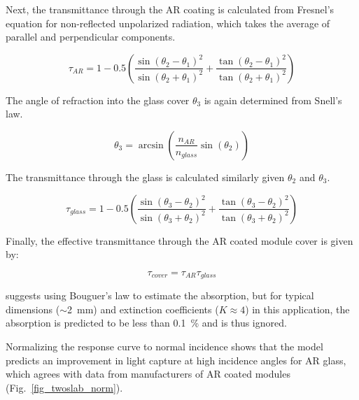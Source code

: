 \documentclass[12pt,letterpaper]{article}
\begin{document}
Next, the transmittance through the AR coating is calculated from Fresnel's equation for non-reflected unpolarized radiation, which takes the average of parallel and perpendicular components.

\begin{equation}\label{fresnel1}
\tau_{AR} = 1 - 0.5
        \left( \frac{\sin(\theta_2-\theta_1)^2}{\sin(\theta_2+\theta_1)^2} 
               + \frac{\tan(\theta_2-\theta_1)^2}{\tan(\theta_2+\theta_1)^2}  \right)
\end{equation}

The angle of refraction into the glass cover $\theta_3$ is again determined from Snell's law.

\begin{equation}\label{snell1}
\theta_3 = \arcsin\left( \frac{n_{AR}}{n_{glass}} \sin(\theta_2 ) \right)
\end{equation}

The transmittance through the glass is calculated similarly given $\theta_2$ and $\theta_3$.

\begin{equation}\label{fresnel1}
\tau_{glass} = 1 - 0.5
        \left( \frac{\sin(\theta_3-\theta_2)^2}{\sin(\theta_3+\theta_2)^2} 
               + \frac{\tan(\theta_3-\theta_2)^2}{\tan(\theta_3+\theta_2)^2}  \right)
\end{equation}

Finally, the effective transmittance through the AR coated module cover is given by:

\begin{equation}\label{tau_eff}
\tau_{cover} = \tau_{AR}\tau_{glass}
\end{equation}

\cite{desoto2004a} suggests using Bouguer's law to estimate the absorption, but for typical dimensions ($\sim$2~mm) and extinction coefficients ($K\approx 4$) in this application, the absorption is predicted to be less than 0.1~\% and is thus ignored.

Normalizing the response curve to normal incidence shows that the model predicts an improvement in light capture at high incidence angles for AR glass, which agrees with data from manufacturers of AR coated modules (Fig.~\ref{fig_twoslab_norm}).
\end{document}
